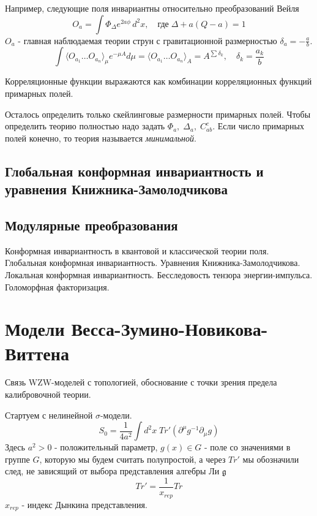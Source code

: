 \documentclass[a4paper,12pt]{article}
\theoremstyle{definition} \newtheorem{Def}{Definition}
\begin{document}
Например, следующие поля инвариантны относительно преобразований Вейля
\begin{equation}
  \label{eq:68}
  O_a=\int \Phi_{\Delta}e^{2a\phi}\,d^2x,\quad \mbox{где}\;\Delta+a(Q-a)=1
\end{equation}
$O_a$ - главная наблюдаемая теории струн с гравитационной размерностью $\delta_a=-\frac{a}{b}$.
\begin{equation}
  \label{eq:69}
  \int\langle O_{a_1}\dots O_{a_n}\rangle_{\mu} e^{-\mu A}d\mu=\langle O_{a_1}\dots O_{a_n}\rangle_{A}=A^{\sum \delta_k},\quad \delta_k=\frac{a_k}{b}
\end{equation}

Корреляционные функции выражаются как комбинации корреляционных функций примарных полей.

Осталось определить только скейлинговые размерности примарных полей. Чтобы определить теорию полностью надо задать $\Phi_a,\; \Delta_a,\; C^c_{ab}$. Если число примарных полей конечно, то теория называется {\it минимальной}.

\subsection{Глобальная конформная инвариантность и уравнения Книжника-Замолодчикова}
\label{sec:knizhnik-zamolodchikov}

\subsection{Модулярные преобразования}
\label{sec:modular}


Конформная инвариантность в квантовой и классической теории поля.
Глобальная конформная инвариантность.
Уравнения Книжника-Замолодчикова.
Локальная конформная инвариантность. Бесследовость тензора энергии-импульса.
Голоморфная факторизация.

\section{Модели Весса-Зумино-Новикова-Виттена}
\label{sec:WZNW}

Связь WZW-моделей с топологией, обоснование с точки зрения предела калибровочной теории.

Стартуем с нелинейной $\sigma$-модели.
\begin{equation}
  \label{eq:48}
  S_0=\frac{1}{4a^2}\int d^2x\; Tr' (\partial^{\mu}g^{-1}\partial_{\mu}g)
\end{equation}
Здесь $a^2>0$ - положительный параметр, $g(x)\in G$ - поле со значениями в группе $G$, которую мы будем считать полупростой, а через $Tr'$ мы обозначили след, не зависящий от выбора представления алгебры Ли $\mathfrak{g} $
\begin{equation}
  \label{eq:70}
  Tr'=\frac{1}{x_{rep}}Tr
\end{equation}
$x_{rep}$ - индекс Дынкина представления.
\end{document}
